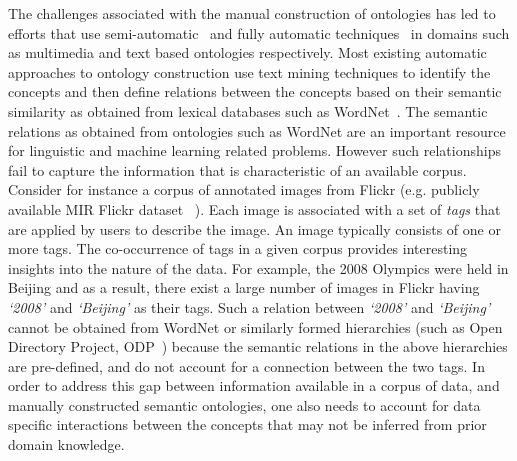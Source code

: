 {The challenges associated with the manual construction of ontologies has led to efforts that use semi-automatic~\cite{jaimes2003semi} and fully automatic techniques~\cite{buitelaar2005ontology} in domains such as multimedia and text based ontologies respectively. 
Most existing automatic approaches to ontology construction use text mining techniques to identify the concepts and then define relations between the concepts based on their semantic similarity as obtained from lexical databases such as WordNet~\cite{wordnet}.
The semantic relations as obtained from ontologies such as WordNet are an important resource for linguistic and machine learning related problems. However such relationships fail to capture the information that is characteristic of an available corpus. Consider for instance a corpus of annotated images from Flickr (e.g. publicly available MIR Flickr dataset ~\cite{huiskes08}). Each image is associated with a set of {\em tags} that are applied by users to describe the image. 
An image typically consists of one or more tags. The co-occurrence of tags in a given corpus provides interesting insights into the nature of the data. For example, the 2008 Olympics were held in Beijing and as a result, there exist a large number of images in Flickr having \emph{`2008'} and \emph{`Beijing'} as their tags. Such a relation between \emph{`2008'} and \emph{`Beijing'} cannot be obtained from WordNet or similarly formed hierarchies (such as Open Directory Project, ODP~\cite{website:ODP}) because the semantic relations in the above hierarchies are pre-defined, and do not account for a connection between the two tags. In order to address this gap between information available in a corpus of data, and manually constructed semantic ontologies, one also needs to account for data specific interactions between the concepts that may not be inferred from prior domain knowledge.

}
